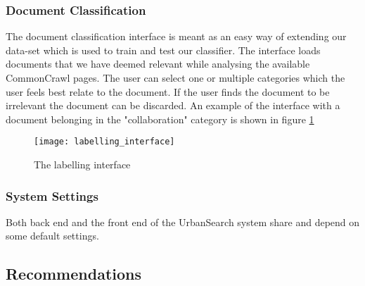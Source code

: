 \subsubsection{Document Classification}
The document classification interface is meant as an easy way of extending our data-set which is used to train and test our classifier. The interface loads documents that we have deemed relevant while analysing the available CommonCrawl pages. The user can select one or multiple categories which the user feels best relate to the document. If the user finds the document to be irrelevant the document can be discarded. An example of the interface with a document belonging in the "collaboration" category is shown in figure \ref{fig:frontend-label}

\begin{figure}[H]
\centering
\texttt{[image: labelling\_interface]}
\caption{The labelling interface}
\label{fig:frontend-label}
\end{figure}

\subsubsection{System Settings}

Both back end and the front end of the UrbanSearch system share and depend on some default settings. 

\subsection{Recommendations}